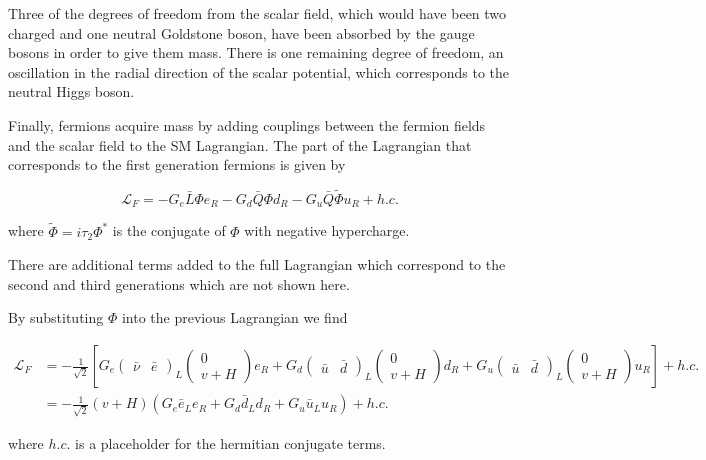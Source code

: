 	Three of the degrees of freedom from the scalar field, which would have been two charged and one neutral Goldstone boson, have been absorbed by the gauge bosons in order to give them mass. There is one remaining degree of freedom, an oscillation in the radial direction of the scalar potential, which corresponds to the neutral Higgs boson.

	Finally, fermions acquire mass by adding couplings between the fermion fields and the scalar field to the SM Lagrangian. The part of the Lagrangian that corresponds to the first generation fermions is given by

		\begin{equation}
		\mathcal{L}_{F} = -G_{e}\bar{L}\Phi e_{R} - G_{d}\bar{Q}\Phi d_{R} - G_{u}\bar{Q}\tilde{\Phi}u_{R}+h.c.
		\end{equation}

	where $\tilde{\Phi}=i\tau_{2}\Phi^{*}$ is the conjugate of $\Phi$ with negative hypercharge.

	There are additional terms added to the full Lagrangian which correspond to the second and third generations which are not shown here.

	By substituting $\Phi$ into the previous Lagrangian we find

		\begin{align}
		\mathcal{L}_{F} &= -\frac{1}{\sqrt{2}}[G_{e}\begin{pmatrix} \bar{\nu} & \bar{e} \end{pmatrix}_{L}\begin{pmatrix} 0 \\ v+H \end{pmatrix}e_{R}+G_{d}\begin{pmatrix}\bar{u} & \bar{d}\end{pmatrix}_{L}\begin{pmatrix} 0 \\ v+H \end{pmatrix}d_{R} + G_{u}\begin{pmatrix}\bar{u} & \bar{d}\end{pmatrix}_{L}\begin{pmatrix} 0 \\ v+H \end{pmatrix}u_{R}] + h.c. \\
		&= -\frac{1}{\sqrt{2}}(v+H)(G_{e}\bar{e}_{L}e_{R}+G_{d}\bar{d}_{L}d_{R}+G_{u}\bar{u}_{L}u_{R})+h.c. 
		\end{align}

	where $h.c.$ is a placeholder for the hermitian conjugate terms. 


